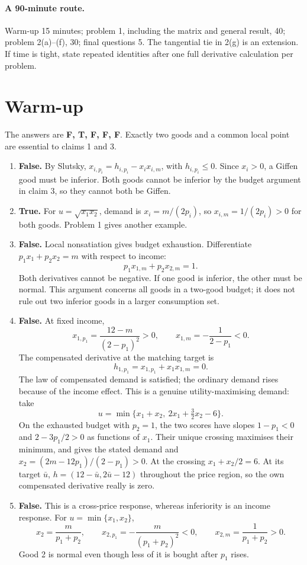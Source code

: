\documentclass[11pt,a4paper]{article}
\begin{document}

\paragraph{A 90-minute route.} Warm-up 15 minutes; problem 1, including
the matrix and general result, 40; problem 2(a)--(f), 30; final questions 5.
The tangential tie in 2(g) is an extension. If time is tight, state repeated
identities after one full derivative calculation per problem.

\section*{Warm-up}
The answers are \textbf{F, T, F, F, F}. Exactly two goods and a common
local point are essential to claims 1 and 3.
\begin{enumerate}[label=\arabic*.]
\item \textbf{False.} By Slutsky,
$x_{i,p_i}=h_{i,p_i}-x_i x_{i,m}$, with $h_{i,p_i}\le0$.
Since $x_i>0$, a Giffen good must be inferior. Both goods cannot be
inferior by the budget argument in claim 3, so they cannot both be Giffen.
\item \textbf{True.} For $u=\sqrt{x_1x_2}$, demand is
$x_i=m/(2p_i)$, so $x_{i,m}=1/(2p_i)>0$ for both goods.
Problem 1 gives another example.
\item \textbf{False.} Local nonsatiation gives budget exhaustion.
Differentiate $p_1x_1+p_2x_2=m$ with respect to income:
\[
 p_1x_{1,m}+p_2x_{2,m}=1.
\]
Both derivatives cannot be negative. If one good is inferior, the other
must be normal. This argument concerns all goods in a two-good budget;
it does not rule out two inferior goods in a larger consumption set.
\item \textbf{False.} At fixed income,
\[
 x_{1,p_1}=\frac{12-m}{(2-p_1)^2}>0,
 \qquad x_{1,m}=-\frac1{2-p_1}<0.
\]
The compensated derivative at the matching target is
\[
 h_{1,p_1}=x_{1,p_1}+x_1x_{1,m}=0.
\]
The law of compensated demand is satisfied; the ordinary demand rises
because of the income effect. This is a genuine utility-maximising demand:
take
\[
 u=\min\{x_1+x_2,\ 2x_1+\tfrac32x_2-6\}.
\]
On the exhausted budget with $p_2=1$, the two scores have slopes
$1-p_1<0$ and $2-3p_1/2>0$ as functions of $x_1$.
Their unique crossing maximises their minimum, and gives the stated demand
and $x_2=(2m-12p_1)/(2-p_1)>0$.
At the crossing $x_1+x_2/2=6$. At its target $\bar u$,
$h=(12-\bar u,2\bar u-12)$ throughout the price region, so the own
compensated derivative really is zero.
\item \textbf{False.} This is a cross-price response, whereas inferiority
is an income response. For $u=\min\{x_1,x_2\}$,
\[
 x_2=\frac m{p_1+p_2},\qquad
 x_{2,p_1}=-\frac m{(p_1+p_2)^2}<0,\qquad
 x_{2,m}=\frac1{p_1+p_2}>0.
\]
Good 2 is normal even though less of it is bought after $p_1$ rises.
\end{enumerate}
\end{document}
